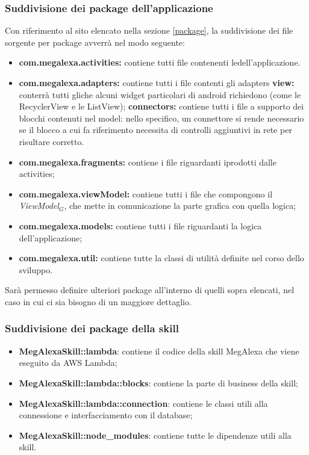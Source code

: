 \subsubsection{Suddivisione dei package dell'applicazione}
Con riferimento al sito elencato nella sezione \ref{package}, la suddivisione dei file sorgente per package avverrà nel modo seguente:

\begin{itemize}
	\item  \textbf{com.megalexa.activities:} contiene tutti file contenenti ledell'applicazione.
	\item  \textbf{com.megalexa.adapters:} contiene tutti i file contenti gli adapters
			\subitem \textbf{view:} conterrà tutti gliche alcuni widget particolari di android richiedono (come le RecyclerView e le ListView);
			\subitem \textbf{connectors:} contiene tutti i file a supporto dei blocchi contenuti nel model: nello specifico, un connettore si rende necessario se il blocco a cui fa riferimento necessita di controlli aggiuntivi in rete per risultare corretto.
	\item  \textbf{com.megalexa.fragments:} contiene i file riguardanti iprodotti dalle activities;
	\item  \textbf{com.megalexa.viewModel:}	contiene tutti i file che compongono il \textit{ViewModel$_{G}$}, che mette in comunicazione la parte grafica con quella logica;	
	\item  \textbf{com.megalexa.models:} contiene tutti i file riguardanti la logica dell'applicazione;
	\item  \textbf{com.megalexa.util:} contiene tutte la classi di utilità definite nel corso dello sviluppo.	

\end{itemize}
Sarà permesso definire ulteriori package all'interno di quelli sopra elencati, nel caso in cui ci sia bisogno di un maggiore dettaglio.
\subsubsection{Suddivisione dei package della skill}
	\begin{itemize}
		\item \textbf{MegAlexaSkill::lambda}: contiene il codice della skill MegAlexa che viene eseguito da AWS Lambda;
		\item \textbf{MegAlexaSkill::lambda::blocks}: contiene la parte di business della skill;
		\item \textbf{MegAlexaSkill::lambda::connection}: contiene le classi utili alla connessione e interfacciamento con il database;
		\item \textbf{MegAlexaSkill::node\_modules}: contiene tutte le dipendenze utili alla skill.
	\end{itemize}

